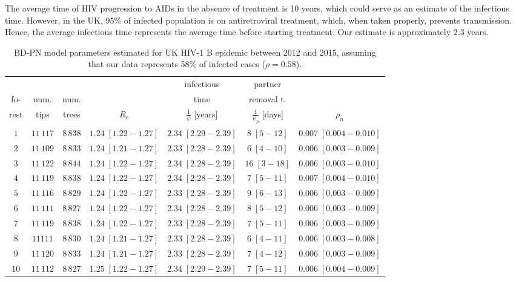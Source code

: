 \documentclass[a4paper,10pt]{article}
\begin{document}
The average time of HIV progression to AIDs in the absence of treatment is 10 years, which could serve as an estimate of the infectious time. However, in the UK, 95\% of infected population is on antiretroviral treatment, which, when taken properly, prevents transmission. Hence, the average infectious time represents the average time before starting treatment. Our estimate is approximately 2.3 years. 

\begin{table}
\caption{BD-PN model parameters estimated for UK HIV-1 B epidemic between 2012 and 2015, assuming that our data represents 58\% of infected cases ($\rho=0.58$).}
\label{tbl:uk}
\begin{tabular}{c|cc|cccc}
&&&&infectious&partner&\\
fo-&num.&num.&&time&removal t.&\\
rest&tips&trees&$R_e$&$\frac{1}{\psi}$ [years]& $\frac{1}{\psi_p}$ [days]&$\rho_n$\\
\toprule
 $1$ & $11\,117$ & $8\,838$& $1.24\;[1.22-1.27]$& $2.34\;[2.29-2.39]$& $8\;[5-12]$& $0.007\;[0.004-0.010]$ \\
 $2$ & $11\,109$ & $8\,833$& $1.24\;[1.21-1.27]$& $2.33\;[2.28-2.39]$& $6\;[4-10]$& $0.006\;[0.003-0.009]$ \\
 $3$ & $11\,122$ & $8\,844$& $1.24\;[1.22-1.27]$& $2.34\;[2.28-2.39]$& $16\;[3-18]$& $0.006\;[0.003-0.010]$ \\
 $4$ & $11\,119$ & $8\,838$& $1.24\;[1.22-1.27]$& $2.34\;[2.28-2.39]$& $7\;[5-11]$& $0.007\;[0.004-0.010]$ \\
 $5$ & $11\,116$ & $8\,829$& $1.24\;[1.22-1.27]$& $2.33\;[2.28-2.39]$& $9\;[6-13]$& $0.006\;[0.003-0.009]$ \\
 $6$ & $11\,111$ & $8\,827$& $1.24\;[1.22-1.27]$& $2.34\;[2.28-2.39]$& $8\;[5-12]$& $0.006\;[0.003-0.009]$ \\
 $7$ & $11\,119$ & $8\,838$& $1.24\;[1.22-1.27]$& $2.33\;[2.28-2.39]$& $7\;[5-11]$& $0.006\;[0.003-0.009]$ \\
 $8$ & $11111$ & $8\,830$& $1.24\;[1.21-1.27]$& $2.33\;[2.28-2.39]$& $6\;[4-11]$& $0.006\;[0.003-0.008]$ \\
 $9$ & $11\,120$ & $8\,833$& $1.24\;[1.21-1.27]$& $2.33\;[2.28-2.39]$& $7\;[4-12]$& $0.006\;[0.003-0.009]$ \\
 $10$ & $11\,112$ & $8\,827$& $1.25\;[1.22-1.27]$& $2.34\;[2.29-2.39]$& $7\;[5-11]$& $0.006\;[0.004-0.009]$ \\
 \bottomrule
 \end{tabular}
 \end{table}
\end{document}
